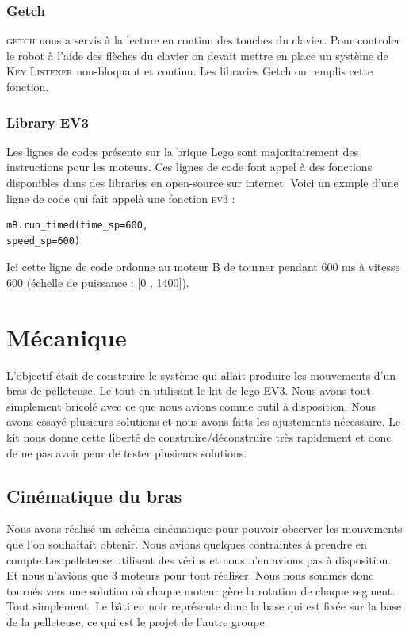 \documentclass[twoside,twocolumn, 16pt]{article}
\begin{document}
\subsubsection{Getch}
\textsc{getch} nous a servis à la lecture en continu des touches du clavier. Pour controler le robot à l'aide des flèches du clavier on devait mettre en place un système de \textsc{Key Listener} non-bloquant et continu. Les libraries Getch on remplis cette fonction.

\subsubsection{Library EV3}
Les lignes de codes présente sur la brique Lego sont majoritairement des instructions pour les moteurs. Ces lignes de code font appel à des fonctions disponibles dans des libraries en open-source sur internet. Voici un exmple d'une ligne de code qui fait appelà une fonction \textsc{ev3} : \\
\vspace{-0.5cm}
\begin{lstlisting}
mB.run_timed(time_sp=600, 
speed_sp=600)
\end{lstlisting}
Ici cette ligne de code ordonne au moteur B de tourner pendant 600 ms à vitesse 600 (échelle de puissance : [0 , 1400]).


\section{Mécanique}

L’objectif était de construire le système qui allait produire les mouvements d’un bras de pelleteuse. Le tout en utilisant le kit de lego EV3. Nous avons tout simplement bricolé avec ce que nous avions comme outil à disposition. Nous avons essayé plusieurs solutions et nous avons faits les ajustements nécessaire. Le kit nous donne cette liberté de construire/déconstruire très rapidement et donc de ne pas avoir peur de tester plusieurs solutions. 

\subsection{Cinématique du bras}

Nous avons réalisé un schéma cinématique pour pouvoir observer les mouvements que l’on souhaitait obtenir. Nous avions quelques contraintes à prendre en compte.Les pelleteuse utilisent des vérins et nous n’en avions pas à disposition.
Et nous n’avions que 3 moteurs pour tout réaliser.
Nous nous sommes donc tournés vers une solution où chaque moteur gère la rotation de chaque segment. Tout simplement.
Le bâti en noir représente donc la base qui est fixée sur la base de la pelleteuse, ce qui est le projet de l'autre groupe.
\end{document}
